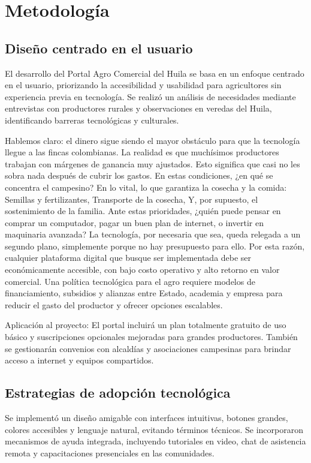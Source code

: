 \section{Metodología}

\subsection{Diseño centrado en el usuario}
El desarrollo del Portal Agro Comercial del Huila se basa en un enfoque centrado en el usuario, priorizando la accesibilidad y usabilidad para agricultores sin experiencia previa en tecnología. Se realizó un análisis de necesidades mediante entrevistas con productores rurales y observaciones en veredas del Huila, identificando barreras tecnológicas y culturales.

Hablemos claro: el dinero sigue siendo el mayor obstáculo para que la tecnología llegue a las fincas colombianas. La realidad es que muchísimos productores trabajan con márgenes de ganancia muy ajustados. Esto significa que casi no les sobra nada después de cubrir los gastos. En estas condiciones, ¿en qué se concentra el campesino? En lo vital, lo que garantiza la cosecha y la comida: Semillas y fertilizantes, Transporte de la cosecha, Y, por supuesto, el sostenimiento de la familia. Ante estas prioridades, ¿quién puede pensar en comprar un computador, pagar un buen plan de internet, o invertir en maquinaria avanzada? La tecnología, por necesaria que sea, queda relegada a un segundo plano, simplemente porque no hay presupuesto para ello. Por esta razón, cualquier plataforma digital que busque ser implementada debe ser económicamente accesible, con bajo costo operativo y alto retorno en valor comercial. Una política tecnológica para el agro requiere modelos de financiamiento, subsidios y alianzas entre Estado, academia y empresa para reducir el gasto del productor y ofrecer opciones escalables.

Aplicación al proyecto: El portal incluirá un plan totalmente gratuito de uso básico y suscripciones opcionales mejoradas para grandes productores. También se gestionarán convenios con alcaldías y asociaciones campesinas para brindar acceso a internet y equipos compartidos.

\subsection{Estrategias de adopción tecnológica}
Se implementó un diseño amigable con interfaces intuitivas, botones grandes, colores accesibles y lenguaje natural, evitando términos técnicos. Se incorporaron mecanismos de ayuda integrada, incluyendo tutoriales en video, chat de asistencia remota y capacitaciones presenciales en las comunidades.

